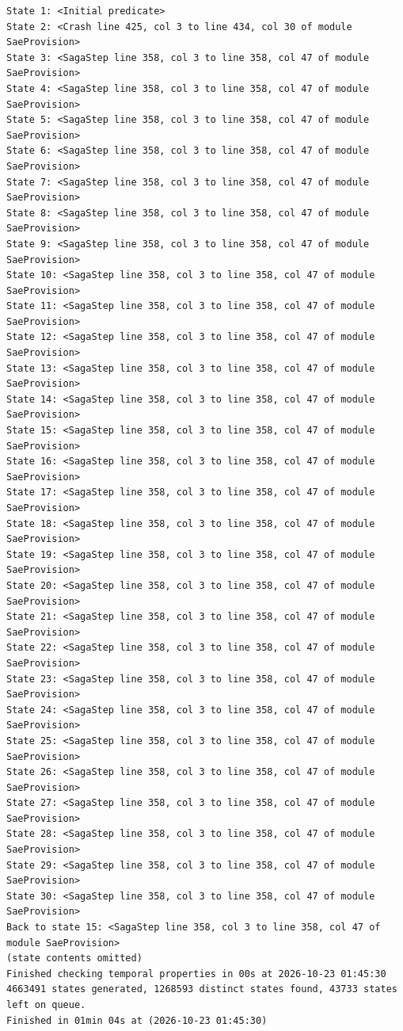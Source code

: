 \documentclass[11pt,a4paper]{article}
\begin{document}
\begin{lstlisting}[float, caption={mutations/mut\_a\_localfirst.cfg result}, captionpos=t, label={lst:tlc-mut-a-localfirst}]
State 1: <Initial predicate>
State 2: <Crash line 425, col 3 to line 434, col 30 of module SaeProvision>
State 3: <SagaStep line 358, col 3 to line 358, col 47 of module SaeProvision>
State 4: <SagaStep line 358, col 3 to line 358, col 47 of module SaeProvision>
State 5: <SagaStep line 358, col 3 to line 358, col 47 of module SaeProvision>
State 6: <SagaStep line 358, col 3 to line 358, col 47 of module SaeProvision>
State 7: <SagaStep line 358, col 3 to line 358, col 47 of module SaeProvision>
State 8: <SagaStep line 358, col 3 to line 358, col 47 of module SaeProvision>
State 9: <SagaStep line 358, col 3 to line 358, col 47 of module SaeProvision>
State 10: <SagaStep line 358, col 3 to line 358, col 47 of module SaeProvision>
State 11: <SagaStep line 358, col 3 to line 358, col 47 of module SaeProvision>
State 12: <SagaStep line 358, col 3 to line 358, col 47 of module SaeProvision>
State 13: <SagaStep line 358, col 3 to line 358, col 47 of module SaeProvision>
State 14: <SagaStep line 358, col 3 to line 358, col 47 of module SaeProvision>
State 15: <SagaStep line 358, col 3 to line 358, col 47 of module SaeProvision>
State 16: <SagaStep line 358, col 3 to line 358, col 47 of module SaeProvision>
State 17: <SagaStep line 358, col 3 to line 358, col 47 of module SaeProvision>
State 18: <SagaStep line 358, col 3 to line 358, col 47 of module SaeProvision>
State 19: <SagaStep line 358, col 3 to line 358, col 47 of module SaeProvision>
State 20: <SagaStep line 358, col 3 to line 358, col 47 of module SaeProvision>
State 21: <SagaStep line 358, col 3 to line 358, col 47 of module SaeProvision>
State 22: <SagaStep line 358, col 3 to line 358, col 47 of module SaeProvision>
State 23: <SagaStep line 358, col 3 to line 358, col 47 of module SaeProvision>
State 24: <SagaStep line 358, col 3 to line 358, col 47 of module SaeProvision>
State 25: <SagaStep line 358, col 3 to line 358, col 47 of module SaeProvision>
State 26: <SagaStep line 358, col 3 to line 358, col 47 of module SaeProvision>
State 27: <SagaStep line 358, col 3 to line 358, col 47 of module SaeProvision>
State 28: <SagaStep line 358, col 3 to line 358, col 47 of module SaeProvision>
State 29: <SagaStep line 358, col 3 to line 358, col 47 of module SaeProvision>
State 30: <SagaStep line 358, col 3 to line 358, col 47 of module SaeProvision>
Back to state 15: <SagaStep line 358, col 3 to line 358, col 47 of module SaeProvision>
(state contents omitted)
Finished checking temporal properties in 00s at 2026-10-23 01:45:30
4663491 states generated, 1268593 distinct states found, 43733 states left on queue.
Finished in 01min 04s at (2026-10-23 01:45:30)
\end{lstlisting}
\bigskip
\end{document}

